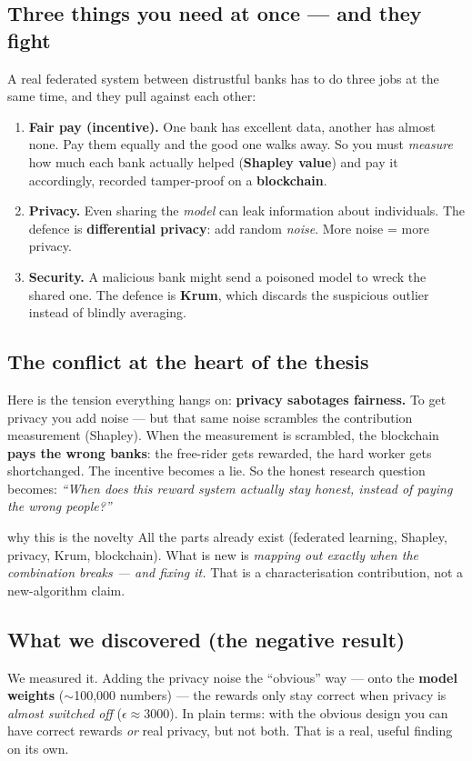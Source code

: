 \documentclass[11pt]{article}
\begin{document}
\subsection{Three things you need at once --- and they fight}
A real federated system between distrustful banks has to do three jobs at the same time, and they pull
against each other:
\begin{enumerate}
  \item \textbf{Fair pay (incentive).} One bank has excellent data, another has almost none. Pay them
  equally and the good one walks away. So you must \emph{measure} how much each bank actually helped
  (\textbf{Shapley value}) and pay it accordingly, recorded tamper-proof on a \textbf{blockchain}.
  \item \textbf{Privacy.} Even sharing the \emph{model} can leak information about individuals. The
  defence is \textbf{differential privacy}: add random \emph{noise}. More noise = more privacy.
  \item \textbf{Security.} A malicious bank might send a poisoned model to wreck the shared one. The
  defence is \textbf{Krum}, which discards the suspicious outlier instead of blindly averaging.
\end{enumerate}

\subsection{The conflict at the heart of the thesis}
Here is the tension everything hangs on: \textbf{privacy sabotages fairness.} To get privacy you add
noise --- but that same noise scrambles the contribution measurement (Shapley). When the measurement is
scrambled, the blockchain \textbf{pays the wrong banks}: the free-rider gets rewarded, the hard worker
gets shortchanged. The incentive becomes a lie. So the honest research question becomes:
\emph{``When does this reward system actually stay honest, instead of paying the wrong people?''}

\begin{plain}{why this is the novelty}
All the parts already exist (federated learning, Shapley, privacy, Krum, blockchain). What is new is
\emph{mapping out exactly when the combination breaks --- and fixing it.} That is a characterisation
contribution, not a new-algorithm claim.
\end{plain}

\subsection{What we discovered (the negative result)}
We measured it. Adding the privacy noise the ``obvious'' way --- onto the \textbf{model weights}
($\sim$100{,}000 numbers) --- the rewards only stay correct when privacy is \emph{almost switched off}
($\epsilon\approx3000$). In plain terms: with the obvious design you can have correct rewards \emph{or}
real privacy, but not both. That is a real, useful finding on its own.
\end{document}
